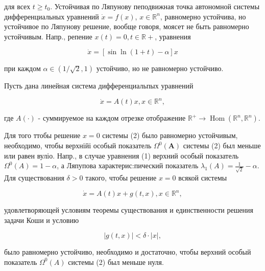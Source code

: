\documentclass[10pt]{article}
\begin{document}
для всех $t \geqslant t_{0}$. Устойчивая по Ляпунову пеподвижная точка автономной системы дифференциальных уравнений $\dot{x}=f(x)$, $x \in \mathbb{R}^{n}$, равномерно устойчива, но устойчивое по Ляпунову решение, вообще говоря, моясет не быть равномерно устойчивым. Напр., репение $x(t)=0, t \in \mathbb{R}+$, уравнения



\[

\dot{x}=[\sin \ln (1+t)-\alpha] x

\]



при каждом $\alpha \in(1 / \sqrt{2}, 1)$ устойчиво, но не равномерно устойчиво.



Пусть дана линейная система дифференциальпых уравнений



\[

\dot{x}=A(t) x, x \in \mathbb{R}^{n},

\]



где $A(\cdot)$ - суммируемое на каждом отрезке отображение $\mathbb{R}^{+} \rightarrow \operatorname{Hom}\left(\mathbb{R}^{n}, \mathbb{R}^{n}\right)$.



Для того ттобы решение $x=0$ системы (2) было равномерно устойчивым, необходимо, чтобы верхнійі особый показатель $\Omega^{0}(\boldsymbol{A})$ системы (2) был меньше или равен вуліо. Напр., в случае уравнения (1) верхний особый показатель $\Omega^{0}(A)=1-\alpha$, а Ляпупова характерис:пический показатель $\lambda_{1}(A)=\frac{1}{\sqrt{2}}-\alpha$. Для существования $\delta>0$ такого, чтобы решение $x=0$ всякой системы



\[

\dot{x}=A(t) x+g(t, x), x \in \mathbb{R}^{n},

\]



удовлетворяющей условиям теоремы существования и единственности решения задачи Коши и условию



\[

|g(t, x)|<\delta \cdot|x|,

\]



было равномерно устойчиво, необходимо и достаточно, чтобы верхний особый показатель $\Omega^{0}(A)$ системы (2) был меньше нуля.
\end{document}
